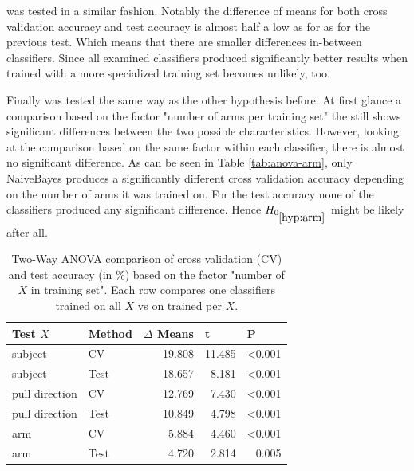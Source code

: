 \documentclass[journal]{IEEEtran}
\begin{document}
 was tested in a similar fashion. Notably the difference of means for both cross validation accuracy and test accuracy is almost half a low as for as for the previous test. Which means that there are smaller differences in-between classifiers. Since all examined classifiers produced significantly better results when trained with a more specialized training set  becomes unlikely, too.

Finally  was tested the same way as the other hypothesis before. At first glance a comparison based on the factor "number of arms per training set" the still shows significant differences between the two possible characteristics. However, looking at the comparison based on the same factor within each classifier, there is almost no significant difference. As can be seen in Table \ref{tab:anova-arm}, only NaiveBayes produces a significantly different cross validation accuracy depending on the number of arms it was trained on. For the test accuracy none of the classifiers produced any significant difference. Hence $H_{0_{\ref{hyp:arm}}}$ might be likely after all.

\begin{table}
\centering
\begin{tabular}{llrrr}
\textbf{Test $X$} & \textbf{Method} & \textbf{$\Delta$ Means} & \multicolumn{1}{l}{\textbf{t}} & \multicolumn{1}{l}{\textbf{P}} \\
\hline
subject                                    & CV              & 19.808                 & 11.485                         & \textless0.001                 \\
subject                                    & Test            & 18.657                 & 8.181                          & \textless0.001                 \\
pull direction                             & CV              & 12.769                 & 7.430                          & \textless0.001                 \\
pull direction                             & Test            & 10.849                 & 4.798                          & \textless0.001                 \\
arm                                        & CV              & 5.884                  & 4.460                          & \textless0.001                 \\
arm                                        & Test            & 4.720                  & 2.814                          & 0.005
\end{tabular}
\caption{Two-Way ANOVA comparison of cross validation (CV) and test accuracy (in \%) based on the factor "number of $X$ in training set". Each row compares one classifiers trained on all $X$ vs on trained per $X$.}
\label{tab:anova}
\end{table}
\end{document}

